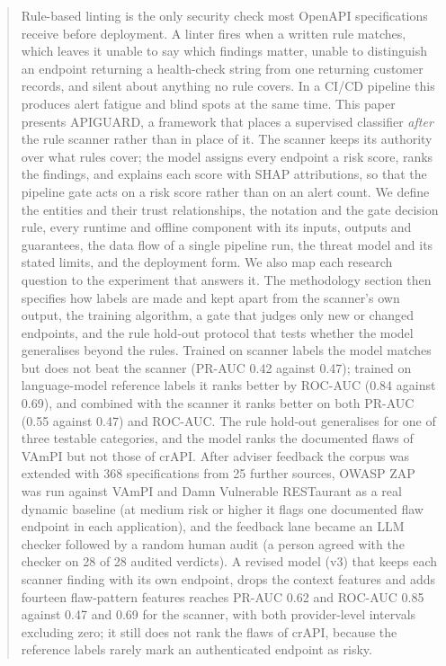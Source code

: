 \documentclass[conference]{IEEEtran}
\begin{document}
\begin{abstract}
Rule-based linting is the only security check most OpenAPI specifications receive before
deployment. A linter fires when a written rule matches, which leaves it unable to say which
findings matter, unable to distinguish an endpoint returning a health-check string from one
returning customer records, and silent about anything no rule covers. In a CI/CD pipeline
this produces alert fatigue and blind spots at the same time. This paper presents
APIGUARD, a framework that places a supervised classifier \emph{after} the
rule scanner rather than in place of it. The scanner keeps its authority over what rules
cover; the model assigns every endpoint a risk score, ranks the findings, and explains each
score with SHAP attributions, so that the pipeline gate acts on a risk score rather than on
an alert count. We define the entities and their trust relationships, the notation and the
gate decision rule, every runtime and offline component with its inputs, outputs and
guarantees, the data flow of a single pipeline run, the threat model and its stated limits,
and the deployment form. We also map each research question to the experiment that
answers it. The methodology section then specifies how labels are made and kept apart from the
scanner's own output, the training algorithm, a gate that judges only new or changed endpoints,
and the rule hold-out protocol that tests whether the model generalises beyond the rules.
Trained on scanner labels the model matches but does not beat the scanner (PR-AUC 0.42 against 0.47); trained on language-model reference labels it ranks better by ROC-AUC (0.84 against 0.69), and combined with the scanner it ranks better on both PR-AUC (0.55 against 0.47) and ROC-AUC. The rule hold-out generalises for one of three testable categories, and the model ranks the documented flaws of VAmPI but not those of crAPI. After adviser feedback the corpus was extended with 368 specifications from 25 further sources, OWASP ZAP was run against VAmPI and Damn Vulnerable RESTaurant as a real dynamic baseline (at medium risk or higher it flags one documented flaw endpoint in each application), and the feedback lane became an LLM checker followed by a random human audit (a person agreed with the checker on 28 of 28 audited verdicts). A revised model (v3) that keeps each scanner finding with its own endpoint, drops the context features and adds fourteen flaw-pattern features reaches PR-AUC 0.62 and ROC-AUC 0.85 against 0.47 and 0.69 for the scanner, with both provider-level intervals excluding zero; it still does not rank the flaws of crAPI, because the reference labels rarely mark an authenticated endpoint as risky.
\end{abstract}
\end{document}
